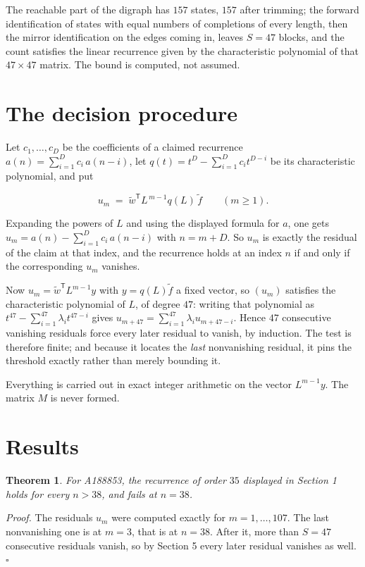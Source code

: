 \documentclass[11pt]{article}
\newtheorem{theorem}{Theorem}
\theoremstyle{definition}
\begin{document}
The reachable part of the digraph has $157$ states, $157$ after trimming; the forward identification of states with equal numbers of completions of every length, then the mirror identification on the edges coming in, leaves $S = 47$ blocks, and the count satisfies the linear recurrence given by the characteristic polynomial of that $47\times47$ matrix. The bound is computed, not assumed.

\section{The decision procedure}

Let $c_1,\dots,c_D$ be the coefficients of a claimed recurrence $a(n) = \sum_{i=1}^{D} c_i\,a(n-i)$, let $q(t) = t^{D} - \sum_{i=1}^{D} c_i t^{D-i}$ be its characteristic polynomial, and put

\[u_m \;=\; \tilde w^{\mathsf T} L^{\,m-1} q(L)\,\tilde f \qquad (m \ge 1).\]

Expanding the powers of $L$ and using the displayed formula for $a$, one gets $u_m = a(n) - \sum_{i=1}^{D} c_i\,a(n-i)$ with $n = m + D$. So $u_m$ is exactly the residual of the claim at that index, and the recurrence holds at an index $n$ if and only if the corresponding $u_m$ vanishes.

Now $u_m = \tilde w^{\mathsf T} L^{m-1} y$ with $y = q(L)\tilde f$ a fixed vector, so $(u_m)$ satisfies the characteristic polynomial of $L$, of degree $47$: writing that polynomial as $t^{47} - \sum_{i=1}^{47} \lambda_i t^{47-i}$ gives $u_{m+47} = \sum_{i=1}^{47} \lambda_i u_{m+47-i}$. Hence $47$ consecutive vanishing residuals force every later residual to vanish, by induction. The test is therefore finite; and because it locates the {\itshape last} nonvanishing residual, it pins the threshold exactly rather than merely bounding it.

Everything is carried out in exact integer arithmetic on the vector $L^{m-1}y$. The matrix $M$ is never formed.

\section{Results}

\begin{theorem} For A188853, the recurrence of order $35$ displayed in Section 1 holds for every $n > 38$, and fails at $n = 38$.\end{theorem}

{\itshape Proof.} The residuals $u_m$ were computed exactly for $m = 1,\dots,107$. The last nonvanishing one is at $m = 3$, that is at $n = 38$. After it, more than $S = 47$ consecutive residuals vanish, so by Section 5 every later residual vanishes as well. $\square$
\end{document}
